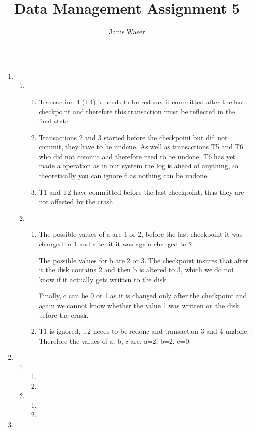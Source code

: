 \documentclass[12pt]{extarticle}
\title{Data Management Assignment 5}
\author{Janis Waser}
\begin{document}
\maketitle \vspace{-10mm}
\rule{\linewidth}{0.4pt}


\begin{flushleft}
\begin{enumerate}[label=\textbf{\Alph*.}]

\item 
\begin{enumerate}[label=\arabic*)]
\item \begin{enumerate}[label=(\alph*)]
\item Transaction 4 (T4) is needs to be redone, it committed after the last checkpoint and therefore this transaction must be reflected in the final state.
\item Transactions 2 and 3 started before the checkpoint but did not commit, they have to be undone. As well as transactions T5 and T6 who did not commit and therefore need to be undone. T6 has yet made a operation as in our system the log is ahead of anything, so theoretically you can ignore 6 as nothing can be undone.
\item T1 and T2 have committed before the last checkpoint, thus they are not affected by the crash.
\end{enumerate}
 \item \begin{enumerate}[label=(\alph*)] 
\item The possible values of a are 1 or 2, before the last checkpoint it was changed to 1 and after it it was again changed to 2. 

The possible values for b are 2 or 3. The checkpoint insures that after it the disk contains 2 and then b is altered to 3, which we do not know if it actually gets written to the disk. 

Finally, c can be 0 or 1 as it is changed only after the checkpoint and again we cannot know whether the value 1 was written on the disk before the crash. 
\item T1 is ignored, T2 needs to be redone and transaction 3 and 4 undone. Therefore the values of a, b, c are: a=2, b=2, c=0. 
\end{enumerate}
\end{enumerate}
\item 
\begin{enumerate}[label=\arabic*)]
\item \begin{enumerate}[label=(\alph*)]
\item
\item
\end{enumerate}
\item \begin{enumerate}[label=(\alph*)]
\item
\item
\end{enumerate}
\end{enumerate}
\item 

\end{enumerate}
\end{flushleft}
\end{document}
